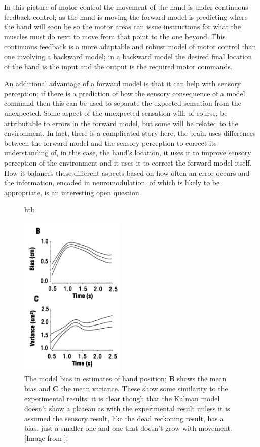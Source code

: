 \documentclass[12pt]{article}
\begin{document}
In this picture of motor control the movement of the hand is under
continuous feedback control; as the hand is moving the forward model
is predicting where the hand will soon be so the motor areas can issue
instructions for what the muscles must do next to move from that point
to the one beyond. This continuous feedback is a more adaptable and
robust model of motor control than one involving a backward model; in
a backward model the desired final location of the hand is the input
and the output is the required motor commands. 

An additional advantage of a forward model is that it can help with
sensory perception; if there is a prediction of how the sensory
consequence of a model command then this can be used to separate the
expected sensation from the unexpected. Some aspect of the unexpected
sensation will, of course, be attributable to errors in the forward
model, but some will be related to the environment. In fact, there is
a complicated story here, the brain uses differences between the
forward model and the sensory perception to correct its understanding
of, in this case, the hand's location, it uses it to improve sensory
perception of the environment and it uses it to correct the forward
model itself. How it balances these different aspects based on how
often an error occurs and the information, encoded in neuromodulation,
of which is likely to be appropriate, is an interesting open question.


\begin{figure}{htb}
\begin{center}
  \includegraphics[width=5cm]{fig_overestimate.png}
\end{center}
\caption{The model bias in estimates of hand position; \textbf{B}
  shows the mean bias and \textbf{C} the mean variance. These show
  some similarity to the experimental results; it is clear though that
  the Kalman model doesn't show a plateau as with the experimental
  result unless it is assumed the sensory result, like the dead
  reckoning result, has a bias, just a smaller one and one that
  doesn't grow with movement. [Image from
    \cite{WolpertEtAl1995}].\label{fig_manipulandum}}
\end{figure}
\end{document}
